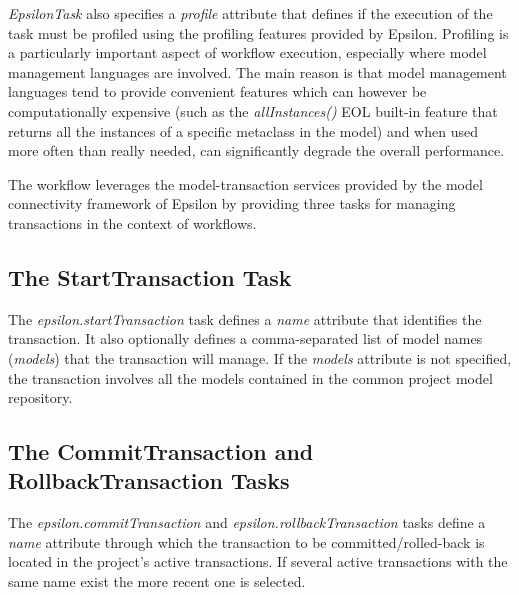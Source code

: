 \emph{EpsilonTask} also specifies a \emph{profile} attribute that defines if the execution of the task must be profiled using the profiling features provided by Epsilon. Profiling is a particularly important aspect of workflow execution, especially where model management languages are involved. The main reason is that model management languages tend to provide convenient features which can however be computationally expensive (such as the \emph{allInstances()} EOL built-in feature that returns all the instances of a specific metaclass in the model) and when used more often than really needed, can significantly degrade the overall performance.






The workflow leverages the model-transaction services provided by the model connectivity framework of Epsilon by providing three tasks for managing transactions in the context of workflows.

\subsection{The StartTransaction Task}

The \emph{epsilon.startTransaction} task defines a \emph{name} attribute that identifies the transaction. It also optionally defines a comma-separated list of model names (\emph{models}) that the transaction will manage. If the \emph{models} attribute is not specified, the transaction involves all the models contained in the common project model repository.

\subsection{The CommitTransaction and RollbackTransaction Tasks}

The \emph{epsilon.commitTransaction} and \emph{epsilon.rollbackTransaction} tasks define a \emph{name} attribute through which the transaction to be committed/rolled-back is located in the project's active transactions. If several active transactions with the same name exist the more recent one is selected.

